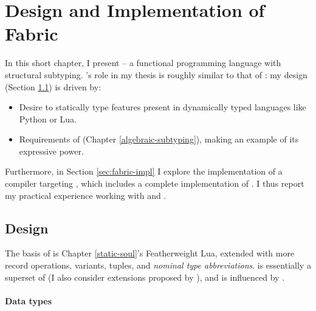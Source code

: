 \chapter{Design and Implementation of Fabric}
\label{fabric}

In this short chapter, I present \textbf{\fabric{}} -- a functional programming language with structural subtyping. 
\fabric{}'s role in my thesis is roughly similar to that of \mlsub{} \cite{dolan-thesis}: my design (Section \ref{sec:fabric-design}) is driven by: \begin{itemize}
    \item Desire to statically type features present in dynamically typed languages like Python or Lua.
    \item Requirements of \inference{} (Chapter \ref{algebraic-subtyping}), making \fabric{} an example of its expressive power.
\end{itemize}
Furthermore, in Section \ref{sec:fabric-impl} I explore the implementation of a \fabric{} compiler targeting \wasm{}, which includes a complete implementation of \inference{}. I thus report my practical experience working with \wasm{} and \inference{}.

\section{Design}
\label{sec:fabric-design}

The basis of \fabric{} is Chapter \ref{static-soul}'s Featherweight Lua, extended with more record operations, variants, tuples, and \emph{nominal type abbreviations}. \fabric{} is essentially a superset of \mlsub{} \cite{mlsub} (I also consider extensions proposed by \textcite{dolan-thesis}), and is influenced by \mlstruct{} \cite{mlstruct}.

\subsubsection{Data types}

